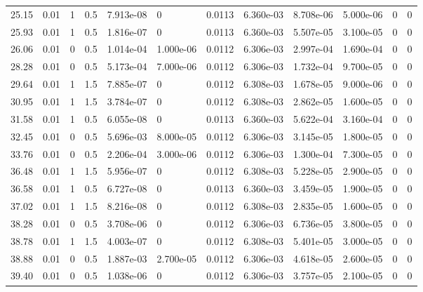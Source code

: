 \documentclass[preview]{standalone}
\begin{document}
{{\begin{tabular}{L{1.2cm}C{1.2cm} C{0.3cm}C{0.5cm} C{1.4cm}C{1.4cm} C{1.4cm}C{1.4cm} C{1.6cm}C{1.6cm} C{1.6cm}C{1.6cm}}
  25.15  &  0.01  & 1     & 0.5 &  7.913e-08  & 0  &  0.0113&   6.360e-03& 8.708e-06 & 5.000e-06   &  0 & 0  \\ 
  25.93  &  0.01  & 1     & 0.5 &  1.816e-07  & 0  &  0.0113&   6.360e-03& 5.507e-05 & 3.100e-05   &  0 & 0  \\ 
  26.06  &  0.01  & 0     & 0.5 &  1.014e-04  & 1.000e-06  &  0.0112&   6.306e-03& 2.997e-04 & 1.690e-04   &  0 & 0  \\ 
  28.28  &  0.01  & 0     & 0.5 &  5.173e-04  & 7.000e-06  &  0.0112&   6.306e-03& 1.732e-04 & 9.700e-05   &  0 & 0  \\ 
  29.64  &  0.01  & 1     & 1.5 &  7.885e-07  & 0  &  0.0112&   6.308e-03& 1.678e-05 & 9.000e-06   &  0 & 0  \\ 
  30.95  &  0.01  & 1     & 1.5 &  3.784e-07  & 0  &  0.0112&   6.308e-03& 2.862e-05 & 1.600e-05   &  0 & 0  \\ 
  31.58  &  0.01  & 1     & 0.5 &  6.055e-08  & 0  &  0.0113&   6.360e-03& 5.622e-04 & 3.160e-04   &  0 & 0  \\ 
  32.45  &  0.01  & 0     & 0.5 &  5.696e-03  & 8.000e-05  &  0.0112&   6.306e-03& 3.145e-05 & 1.800e-05   &  0 & 0  \\ 
  33.76  &  0.01  & 0     & 0.5 &  2.206e-04  & 3.000e-06  &  0.0112&   6.306e-03& 1.300e-04 & 7.300e-05   &  0 & 0  \\ 
  36.48  &  0.01  & 1     & 1.5 &  5.956e-07  & 0  &  0.0112&   6.308e-03& 5.228e-05 & 2.900e-05   &  0 & 0  \\ 
  36.58  &  0.01  & 1     & 0.5 &  6.727e-08  & 0  &  0.0113&   6.360e-03& 3.459e-05 & 1.900e-05   &  0 & 0  \\ 
  37.02  &  0.01  & 1     & 1.5 &  8.216e-08  & 0  &  0.0112&   6.308e-03& 2.835e-05 & 1.600e-05   &  0 & 0  \\ 
  38.28  &  0.01  & 0     & 0.5 &  3.708e-06  & 0  &  0.0112&   6.306e-03& 6.736e-05 & 3.800e-05   &  0 & 0  \\ 
  38.78  &  0.01  & 1     & 1.5 &  4.003e-07  & 0  &  0.0112&   6.308e-03& 5.401e-05 & 3.000e-05   &  0 & 0  \\ 
  38.88  &  0.01  & 0     & 0.5 &  1.887e-03  & 2.700e-05  &  0.0112&   6.306e-03& 4.618e-05 & 2.600e-05   &  0 & 0  \\ 
  39.40  &  0.01  & 0     & 0.5 &  1.038e-06  & 0  &  0.0112&   6.306e-03& 3.757e-05 & 2.100e-05   &  0 & 0  \\ 
\hline 
\end{tabular} 

}}
\end{document}
